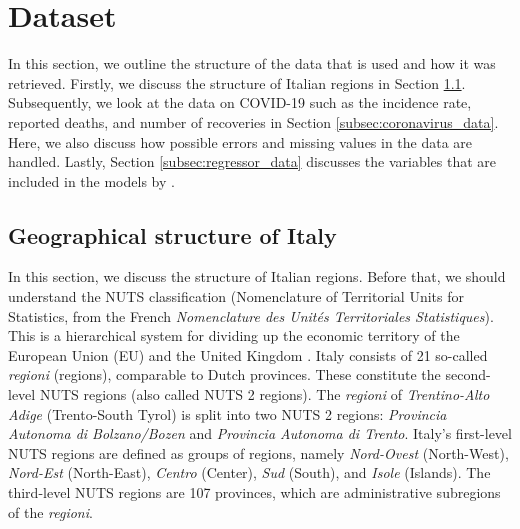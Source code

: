 \documentclass[12pt]{article}
\begin{document}
	\section{Dataset} \label{sec:dataset}
	In this section, we outline the structure of the data that is used and how it was retrieved. Firstly, we discuss the structure of Italian regions in Section \ref{subsec:italy_geography}. Subsequently, we look at the data on COVID-19 such as the incidence rate, reported deaths, and number of recoveries in Section \ref{subsec:coronavirus_data}. Here, we also discuss how possible errors and missing values in the data are handled. Lastly, Section \ref{subsec:regressor_data} discusses the variables that are included in the models by \textcite{adda2016economic}.
	
	\subsection{Geographical structure of Italy} \label{subsec:italy_geography}
	In this section, we discuss the structure of Italian regions. Before that, we should understand the NUTS classification (Nomenclature of Territorial Units for Statistics, from the French \textit{Nomenclature des Unités Territoriales Statistiques}). This is a hierarchical system for dividing up the economic territory of the European Union (EU) and the United Kingdom \parencite{background-nuts}. Italy consists of 21 so-called \textit{regioni} (regions), comparable to Dutch provinces. These constitute the second-level NUTS regions (also called NUTS 2 regions). The \textit{regioni} of \textit{Trentino-Alto Adige} (Trento-South Tyrol) is split into two NUTS 2 regions: \textit{Provincia Autonoma di Bolzano/Bozen} and \textit{Provincia Autonoma di Trento}. Italy's first-level NUTS regions are defined as groups of regions, namely \textit{Nord-Ovest} (North-West), \textit{Nord-Est} (North-East), \textit{Centro} (Center), \textit{Sud} (South), and \textit{Isole} (Islands). The third-level NUTS regions are 107 provinces, which are administrative subregions of the \textit{regioni}.
	
\end{document}
